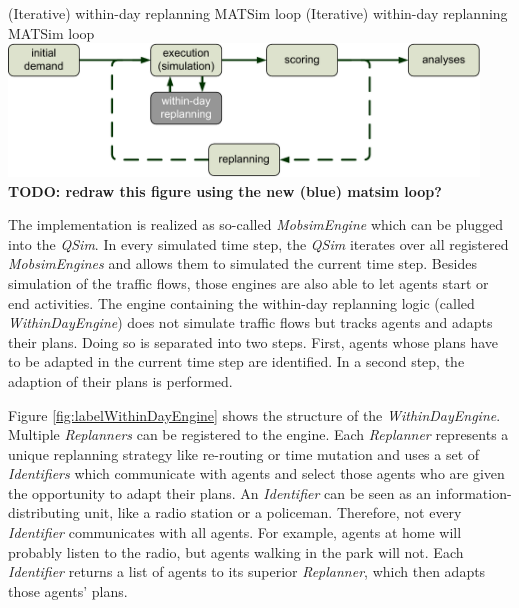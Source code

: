 \createfigure%
{(Iterative) within-day replanning MATSim loop}%
{(Iterative) within-day replanning MATSim loop }%
{\label{fig:labelWithinDayMATSimLoop}}%
{\includegraphics[width=12.5cm, angle=0]{extending/figures/WithinDayReplanning/WithinDayMATSimLoop}}%
{}%
\textbf{TODO: redraw this figure using the new (blue) matsim loop?}

The implementation is realized as so-called \emph{MobsimEngine} which can be plugged into the \emph{QSim}. In every simulated time step, the \emph{QSim} iterates over all registered \emph{MobsimEngines} and allows them to simulated the current time step. Besides simulation of the traffic flows, those engines are also able to let agents start or end activities. The engine containing the within-day replanning logic (called \emph{WithinDayEngine}) does not simulate traffic flows but tracks agents and adapts their plans. Doing so is separated into two steps. First, agents whose plans have to be adapted in the current time step are identified. In a second step, the adaption of their plans is performed. 

Figure \ref{fig:labelWithinDayEngine} shows the structure of the \emph{WithinDayEngine}. Multiple \emph{Replanners} can be registered to the engine. Each \emph{Replanner} represents a unique replanning strategy like re-routing or time mutation and uses a set of \emph{Identifiers} which communicate with agents and select those agents who are given the opportunity to adapt their plans. An \emph{Identifier} can be seen as an information-distributing unit, like a radio station or a policeman. Therefore, not every \emph{Identifier} communicates with all agents. For example, agents at home will probably listen to the radio, but agents walking in the park will not. Each \emph{Identifier} returns a list of agents to its superior \emph{Replanner}, which then adapts those agents' plans.

